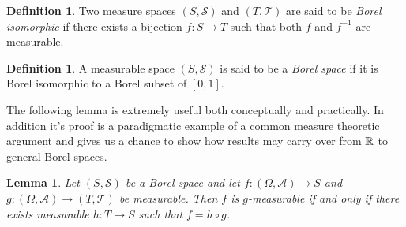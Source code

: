 \documentclass{amsart}
\newtheorem{lem}[thm]{Lemma}
\theoremstyle{remark}
\theoremstyle{definition}
\newtheorem{defn}[thm]{Definition}
\begin{document}
\begin{defn}Two measure spaces $(S, \mathcal{S})$ and $(T,
  \mathcal{T})$ are said to be \emph{Borel isomorphic} if there exists
  a bijection $f : S \to T$ such that both $f$ and $f^{-1}$ are measurable.
\end{defn}

\begin{defn}A measurable space $(S, \mathcal{S})$ is said to be a
  \emph{Borel space} if it is Borel isomorphic to a Borel subset of $[0,1]$.
\end{defn}

The following lemma is extremely useful both conceptually and
practically.  In addition it's proof is a paradigmatic example of a
common measure theoretic argument and gives us a chance to show how
results may carry over from $\mathbb{R}$ to general Borel spaces.
\begin{lem}\label{FunctionalRepresentation}Let $(S, \mathcal{S})$ be a
  Borel space and let $f : (\Omega, \mathcal{A}) \to S$ and $g :
  (\Omega, \mathcal{A}) \to (T,\mathcal{T})$ be measurable.  Then $f$
  is $g$-measurable if and only if there exists measurable $h :
  T  \to S$ such that $f = h \circ g$.
\end{lem}
\end{document}
